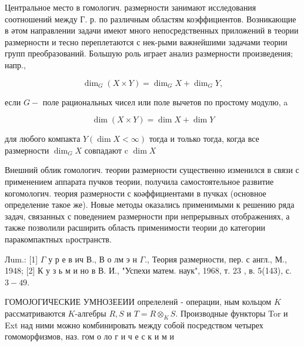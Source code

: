 \documentclass[10pt]{article}
\begin{document}
Центральное место в гомологич. размерности занимают исследования соотношений между $Г$. р. по различным областям коэффициентов. Возникающие в әтом направлении задачи имеют много непосредственных приложений в теории размерности и тесно переплетаются с нек-рыми важнейшими задачами теории групп преобразований. Большую роль играет анализ размерности произведения; напр.,



\[

\operatorname{dim}_{G}(X \times Y)=\operatorname{dim}_{G} X+\operatorname{dim}_{G} Y,

\]



если $G-$ поле рациональных чисел или поле вычетов по простому модулю, a



\[

\operatorname{dim}(X \times Y)=\operatorname{dim} X+\operatorname{dim} Y

\]



для любого компакта $Y(\operatorname{dim} X<\infty)$ тогда и только тогда, когда все размерности $\operatorname{dim}_{G} X$ совпадают c $\operatorname{dim} X$



Внешний облик гомологич. теории размерности существенно изменился в связи с применением аппарата пучков теории, получила самостоятельное развитие когомологич. теория размерности с коәффициентами в пучках (основное определение такое же). Новые методы оказались применимыми к решению ряда задач, связанных с поведением размерности при непрерывных отображениях, а также позволили расширить область применимости теории до категории паракомпактных nространств.



Лum.: [1] $\Gamma$ у р е в ич В., В о лм э н $\Gamma .$, Теория размерности, пер. с англ., М., 1948; [2] К у з ь м и но в В. И., "Успехи матем. наук", 1968, т. 23 , в. 5(143), с. $3-49$.



ГОМОЈОГИЧЕСКИЕ УМНОЗЕЕИИ опрелеленй - операции, ным кольцом $K$ рассматриваются $K$-алгебры $R, S$ и $T=R \otimes_{K} S$. Производные функторы Tor и Ext над ними можно комбинировать между собой посредством четырех гомоморфизмов, наз. гом о ло г и ч е с к и м и
\end{document}
